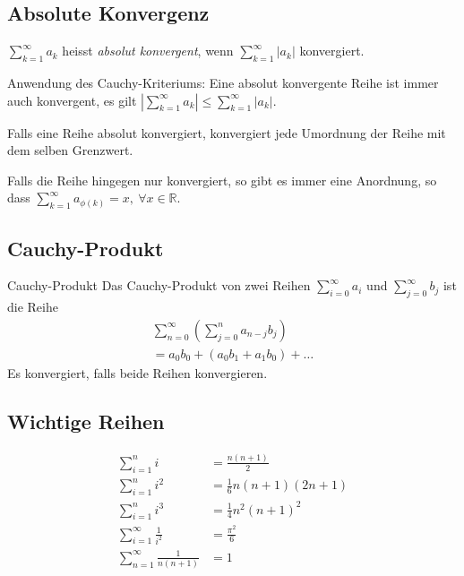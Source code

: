 \documentclass[a4paper,10pt]{article}
\def\sumk{\sum_{k=1}^\infty}
\def\R{\mathbb{R}}
\begin{document}
\subsection{Absolute Konvergenz}
$\sumk a_k$ heisst \emph{absolut konvergent}, wenn $\sumk |a_k|$ konvergiert. 

Anwendung des Cauchy-Kriteriums: Eine absolut konvergente Reihe ist immer auch konvergent, es gilt $|\sumk a_k| \le \sumk |a_k|$.

Falls eine Reihe absolut konvergiert, konvergiert jede Umordnung der Reihe mit dem selben Grenzwert.

Falls die Reihe hingegen nur konvergiert, so gibt es immer eine Anordnung, so dass $\sum_{k=1}^\infty a_{\phi(k)} = x, \ \forall x\in \R$.

\subsection{Cauchy-Produkt}
\begin{subbox}{Cauchy-Produkt}
  Das Cauchy-Produkt von zwei Reihen $\sum_{i = 0}^\infty a_i$ und $\sum_{j = 0}^\infty b_j$ ist die Reihe
  \begin{multline*}
      \sum_{n=0}^\infty \left( \sum_{j=0}^n a_{n-j} b_j \right) \\
      = a_0b_0 + (a_0b_1 + a_1b_0) + \ldots
  \end{multline*}
  Es konvergiert, falls beide Reihen konvergieren.
\end{subbox}

\subsection{Wichtige Reihen}
\begin{align*}
 \sum_{i=1}^n i &= \frac{n(n+1)}{2} \\
 \sum_{i=1}^n i^2 &= \frac{1}{6}n(n+1)(2n+1) \\
 \sum_{i=1}^n i^3 &= \frac{1}{4}n^2(n+1)^2 \\
 \sum_{i=1}^\infty \frac{1}{i^2} &= \frac{\pi^2}{6} \\
 \sum_{n=1}^\infty \frac{1}{n(n+1)} &= 1
\end{align*}
\end{document}

